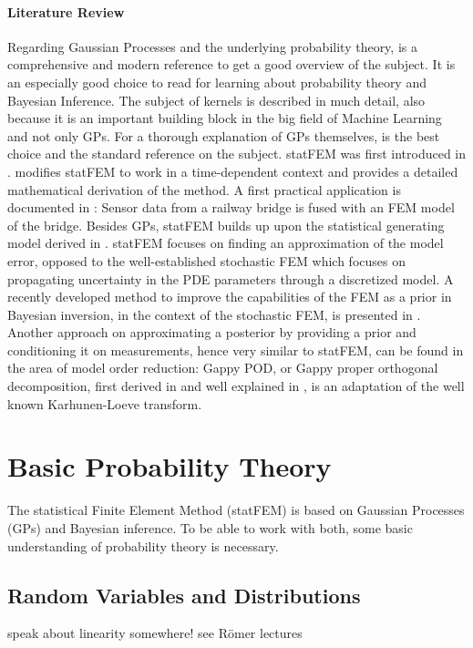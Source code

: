 \documentclass[%
  a4paper,oneside,%
  11pt,%
  smallchapters,
  style=printdev,
  extramargin,
  green,%
  rgb, <cmyk>
  ]{tubsbook}
\begin{document}
\paragraph{Literature Review} Regarding Gaussian Processes and the underlying probability theory, \cite{murphy2012} is a comprehensive and modern reference to get a good overview of the subject. It is an especially good choice to read for learning about probability theory and Bayesian Inference. The subject of kernels is described in much detail, also because it is an important building block in the big field of Machine Learning and not only GPs. For a thorough explanation of GPs themselves, \cite{rasmussen2006} is the best choice and the standard reference on the subject. statFEM was first introduced in \cite{girolami2021}. \cite{Duffin2020} modifies statFEM to work in a time-dependent context and provides a detailed mathematical derivation of the method. A first practical application is documented in \cite{Febrianto2021}: Sensor data from a railway bridge is fused with an FEM model of the bridge. Besides GPs, statFEM builds up upon the statistical generating model derived in \cite{kennedy2001}. statFEM focuses on finding an approximation of the model error, opposed to the well-established stochastic FEM \cite{Stefanou2009} which focuses on propagating uncertainty in the PDE parameters through a discretized model. A recently developed method to improve the capabilities of the FEM as a prior in Bayesian inversion, in the context of the stochastic FEM, is presented in \cite{Abdulle2021}. 
Another approach on approximating a posterior by providing a prior and conditioning it on measurements, hence very similar to statFEM, can be found in the area of model order reduction: Gappy POD, or Gappy proper orthogonal decomposition, first derived in \cite{Everson1995} and well explained in \cite{StevenL.Brunton2019}, is an adaptation of the well known Karhunen-Loeve transform. \cite{Rao2001} \cite{Loeve1994}

\section{Basic Probability Theory}
The statistical Finite Element Method (statFEM) is based on Gaussian Processes (GPs) and Bayesian inference. To be able to work with both, some basic understanding of probability theory is necessary.


\subsection{Random Variables and Distributions}
\label{sec:MultiGauss}
speak about linearity somewhere! see Römer lectures
\end{document}
